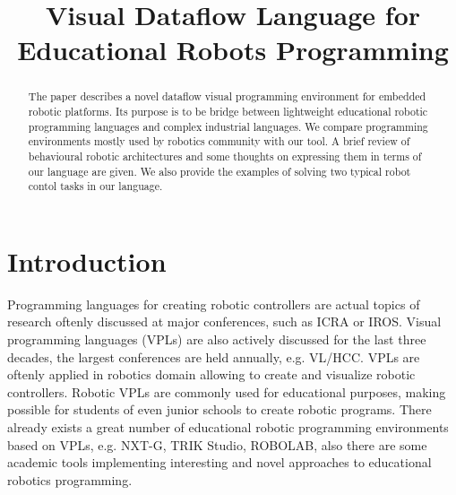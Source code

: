 \documentclass[conference,compsoc]{IEEEtran}
\begin{document}
\title{Visual Dataflow Language for Educational Robots Programming}

\author{
	
	\and

}

\maketitle



\begin{abstract}
The paper describes a novel dataflow visual programming environment for embedded robotic platforms. Its purpose is to be bridge between lightweight educational robotic programming languages and complex industrial languages. We compare programming environments mostly used by robotics community with our tool. A brief review of behavioural robotic architectures and some thoughts on expressing them in terms of our language are given. We also provide the examples of solving two typical robot contol tasks in our language.
\end{abstract}

\section{Introduction}

Programming languages for creating robotic controllers are actual topics of research oftenly discussed at major conferences, such as ICRA\cite{Icra} or IROS\cite{Iros2016}. Visual programming languages (VPLs) are also actively discussed for the last three decades, the largest conferences are held annually, e.g. VL/HCC\cite{VLHCC}. VPLs are oftenly applied in robotics domain\cite{banyasad2000visual,simpson2006mobile,simpson2008visual,posso2011process,diprose2011ruru} allowing to create and visualize robotic controllers. Robotic VPLs are commonly used for educational purposes, making possible for students of even junior schools to create robotic programs. There already exists a great number of educational robotic programming environments based on VPLs, e.g. NXT-G\cite{nxtg}, TRIK Studio\cite{trik}, ROBOLAB\cite{robolab}, also there are some academic tools implementing interesting and novel approaches to educational robotics programming\cite{banyasad2000visual,simpson2008visual,diprose2011ruru}.
\end{document}
